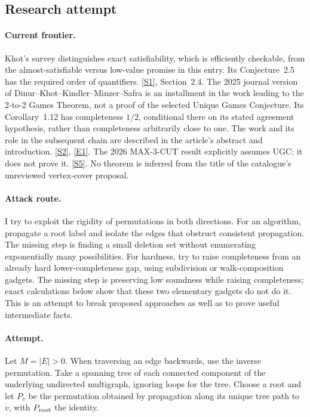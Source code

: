 \documentclass[11pt,a4paper]{article}
\newcommand{\sref}[2]{\hyperlink{source:#1:#2}{[S#2]}}
\newcommand{\eref}[2]{\hyperlink{extra:#1:#2}{[E#2]}}
\numberwithin{equation}{section}
\begin{document}
\subsection{Research attempt}

\paragraph{Current frontier.}
Khot's survey distinguishes exact satisfiability, which is efficiently
checkable, from the almost-satisfiable versus low-value promise in this
entry. Its Conjecture~2.5 has the required order of quantifiers.
\sref{43}{1}, Section~2.4. The 2025 journal version of
Dinur--Khot--Kindler--Minzer--Safra is an installment in the work leading
to the 2-to-2 Games Theorem, not a proof of the selected Unique Games
Conjecture. Its Corollary~1.12 has completeness $1/2$, conditional there
on its stated agreement hypothesis, rather than completeness arbitrarily
close to one. The work and its role in the subsequent chain are described
in the article's abstract and introduction. \sref{43}{2}, \eref{43}{1}.
The 2026 MAX-3-CUT result explicitly assumes UGC; it does not prove it.
\sref{43}{5}. No theorem is inferred from the title of the catalogue's
unreviewed vertex-cover proposal.

\paragraph{Attack route.}
I try to exploit the rigidity of permutations in both directions. For an
algorithm, propagate a root label and isolate the edges that obstruct
consistent propagation. The missing step is finding a small deletion set
without enumerating exponentially many possibilities. For hardness, try
to raise completeness from an already hard lower-completeness gap, using
subdivision or walk-composition gadgets. The missing step is preserving
low soundness while raising completeness; exact calculations below show
that these two elementary gadgets do not do it. This is an attempt to
break proposed approaches as well as to prove useful intermediate facts.

\paragraph{Attempt.}
Let $M=|E|>0$. When traversing an edge backwards, use the inverse
permutation. Take a spanning tree of each connected component of the
underlying undirected multigraph, ignoring loops for the tree. Choose a
root and let $P_v$ be the permutation obtained by propagation along its
unique tree path to $v$, with $P_{\rm root}$ the identity.
\end{document}
